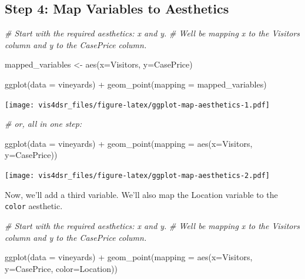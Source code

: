 \documentclass[
]{krantz}
\makeatletter
\newenvironment{Shaded}{\begin{snugshade}}{\end{snugshade}}
\newcommand{\AttributeTok}[1]{\textcolor[rgb]{0.61,0.61,0.61}{#1}}
\newcommand{\CommentTok}[1]{\textcolor[rgb]{0.37,0.37,0.37}{\textit{#1}}}
\newcommand{\FunctionTok}[1]{\textcolor[rgb]{0,0,0}{#1}}
\newcommand{\NormalTok}[1]{#1}
\newcommand{\OtherTok}[1]{\textcolor[rgb]{0.37,0.37,0.37}{#1}}
\newcommand{\SpecialCharTok}[1]{\textcolor[rgb]{0,0,0}{#1}}
\newenvironment{kframe}{%
\medskip{}
\setlength{\fboxsep}{.8em}
 \def\at@end@of@kframe{}%
 \ifinner\ifhmode%
  \def\at@end@of@kframe{\end{minipage}}%
  \begin{minipage}{\columnwidth}%
 \fi\fi%
 \def\FrameCommand##1{\hskip\@totalleftmargin \hskip-\fboxsep
 \colorbox{shadecolor}{##1}\hskip-\fboxsep
     \hskip-\linewidth \hskip-\@totalleftmargin \hskip\columnwidth}%
 \MakeFramed {\advance\hsize-\width
   \@totalleftmargin\z@ \linewidth\hsize
   \@setminipage}}%
 {\par\unskip\endMakeFramed%
 \at@end@of@kframe}
\renewenvironment{Shaded}{\begin{kframe}}{\end{kframe}}
\makeatother
\begin{document}
\hypertarget{step-4-map-variables-to-aesthetics}{%
\subsection{Step 4: Map Variables to Aesthetics}\label{step-4-map-variables-to-aesthetics}}

\begin{Shaded}
\begin{Highlighting}[]
\CommentTok{\# Start with the required aesthetics: x and y.}
\CommentTok{\# We\textquotesingle{}ll be mapping x to the Visitors column and y to the CasePrice column.}

\NormalTok{mapped\_variables }\OtherTok{\textless{}{-}} \FunctionTok{aes}\NormalTok{(}\AttributeTok{x=}\NormalTok{Visitors, }\AttributeTok{y=}\NormalTok{CasePrice)}

\FunctionTok{ggplot}\NormalTok{(}\AttributeTok{data =}\NormalTok{ vineyards) }\SpecialCharTok{+}
  \FunctionTok{geom\_point}\NormalTok{(}\AttributeTok{mapping =}\NormalTok{ mapped\_variables)}
\end{Highlighting}
\end{Shaded}

\texttt{[image: vis4dsr\_files/figure-latex/ggplot-map-aesthetics-1.pdf]}

\begin{Shaded}
\begin{Highlighting}[]
\CommentTok{\# or, all in one step:}

\FunctionTok{ggplot}\NormalTok{(}\AttributeTok{data =}\NormalTok{ vineyards) }\SpecialCharTok{+}
  \FunctionTok{geom\_point}\NormalTok{(}\AttributeTok{mapping =} \FunctionTok{aes}\NormalTok{(}\AttributeTok{x=}\NormalTok{Visitors, }\AttributeTok{y=}\NormalTok{CasePrice))}
\end{Highlighting}
\end{Shaded}

\texttt{[image: vis4dsr\_files/figure-latex/ggplot-map-aesthetics-2.pdf]}

Now, we'll add a third variable. We'll also map the Location variable to the \texttt{color} aesthetic.

\begin{Shaded}
\begin{Highlighting}[]
\CommentTok{\# Start with the required aesthetics: x and y.}
\CommentTok{\# We\textquotesingle{}ll be mapping x to the Visitors column and y to the CasePrice column.}

\FunctionTok{ggplot}\NormalTok{(}\AttributeTok{data =}\NormalTok{ vineyards) }\SpecialCharTok{+}
  \FunctionTok{geom\_point}\NormalTok{(}\AttributeTok{mapping =} \FunctionTok{aes}\NormalTok{(}\AttributeTok{x=}\NormalTok{Visitors, }\AttributeTok{y=}\NormalTok{CasePrice, }\AttributeTok{color=}\NormalTok{Location))}
\end{Highlighting}
\end{Shaded}
\end{document}
